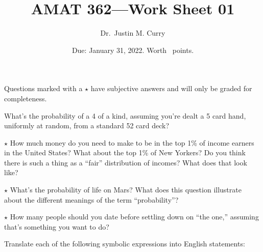 \documentclass[addpoints,12pt]{exam}
\title{\vspace{-1in} AMAT 362---Work Sheet 01}
\date{Due: January 31, 2022. Worth \numpoints\ points.}
\author{Dr.~Justin M. Curry}
\begin{document}
\maketitle



Questions marked with a $\star$ have subjective answers and will only be graded for completeness.

\begin{questions}
\addpoints
\question[2] What's the probability of a 4 of a kind, assuming you're dealt a 5 card hand, uniformly at random, from a standard 52 card deck?

\vspace{1in}

\question[1] $\star$ How much money do you need to make to be in the top 1\% of income earners in the United States? What about the top 1\% of New Yorkers? Do you think there is such a thing as a ``fair'' distribution of incomes? What does that look like?

\vspace{1in}

\question[1] $\star$ What's the probability of life on Mars? What does this question illustrate about the different meanings of the term ``probability''?

\vspace{1in}

%
\question[1] $\star$ How many people should you date before settling down on ``the one,'' assuming that's something you want to do?

\vspace{1in}

\question[6] Translate each of the following symbolic expressions into English statements:

\noaddpoints
{}
\end{questions}
\end{document}
